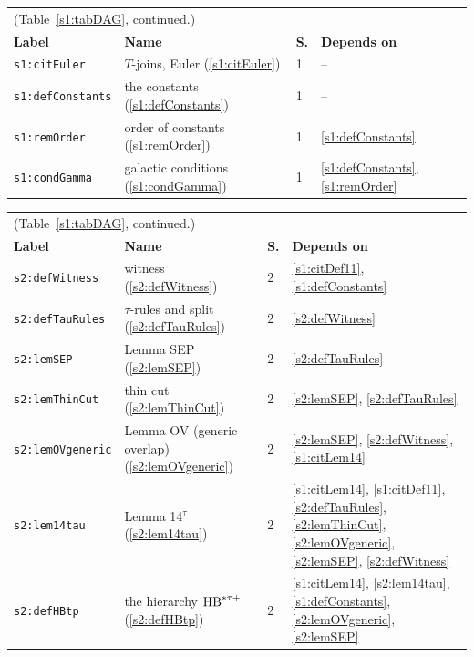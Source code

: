 \begin{center}
{\footnotesize
\setlength{\tabcolsep}{3pt}
\begin{tabular}{p{3.2cm}p{3.6cm}p{0.5cm}p{7.6cm}}
\multicolumn{4}{l}{(Table~\ref{s1:tabDAG}, continued.)}\\
\textbf{Label} & \textbf{Name} & \textbf{S.} & \textbf{Depends on}\\
\hline
\texttt{s1:citEuler} & $T$-joins, Euler (\ref{s1:citEuler}) & 1 & --\\
\texttt{s1:defConstants} & the constants (\ref{s1:defConstants}) & 1 & --\\
\texttt{s1:remOrder} & order of constants (\ref{s1:remOrder}) & 1 & \ref{s1:defConstants}\\
\texttt{s1:condGamma} & galactic conditions (\ref{s1:condGamma}) & 1 & \ref{s1:defConstants}, \ref{s1:remOrder}\\
\hline
\end{tabular}}
\end{center}

\begin{center}
{\footnotesize
\setlength{\tabcolsep}{3pt}
\begin{tabular}{p{3.2cm}p{3.6cm}p{0.5cm}p{7.6cm}}
\multicolumn{4}{l}{(Table~\ref{s1:tabDAG}, continued.)}\\
\textbf{Label} & \textbf{Name} & \textbf{S.} & \textbf{Depends on}\\
\hline
\texttt{s2:defWitness} & witness (\ref{s2:defWitness}) & 2 & \ref{s1:citDef11}, \ref{s1:defConstants}\\
\texttt{s2:defTauRules} & $\tau$-rules and split (\ref{s2:defTauRules}) & 2 & \ref{s2:defWitness}\\
\texttt{s2:lemSEP} & Lemma SEP (\ref{s2:lemSEP}) & 2 & \ref{s2:defTauRules}\\
\texttt{s2:lemThinCut} & thin cut (\ref{s2:lemThinCut}) & 2 & \ref{s2:lemSEP}, \ref{s2:defTauRules}\\
\texttt{s2:lemOVgeneric} & Lemma OV (generic overlap) (\ref{s2:lemOVgeneric}) & 2 & \ref{s2:lemSEP}, \ref{s2:defWitness}, \ref{s1:citLem14}\\
\texttt{s2:lem14tau} & Lemma 14$^\tau$ (\ref{s2:lem14tau}) & 2 & \ref{s1:citLem14}, \ref{s1:citDef11}, \ref{s2:defTauRules}, \ref{s2:lemThinCut}, \ref{s2:lemOVgeneric}, \ref{s2:lemSEP}, \ref{s2:defWitness}\\
\texttt{s2:defHBtp} & the hierarchy $\mathrm{HB}^{*\tau{+}}$ (\ref{s2:defHBtp}) & 2 & \ref{s1:citLem14}, \ref{s2:lem14tau}, \ref{s1:defConstants}, \ref{s2:lemOVgeneric}, \ref{s2:lemSEP}\\
\hline
\end{tabular}}
\end{center}

